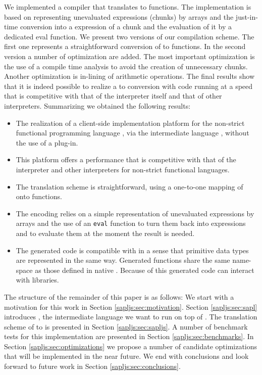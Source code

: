 We implemented a compiler that translates \Sapl to \JS functions. 
The implementation is based on representing unevaluated expressions (chunks) by \JS arrays 
and the just-in-time conversion 
into a \JS expression of a chunk and the evaluation of it by a dedicated \textsf{eval} function.
We present two versions of our compilation scheme. 
The first one represents a straightforward conversion of \Sapl to \JS functions.
In the second version a number of optimization are added.
The most important optimization is the use of a compile time analysis to avoid the creation 
of unnecessary chunks. 
Another optimization is in-lining of arithmetic operations.
The final results show that it is indeed possible to realize a \Sapl to \JS conversion with code running at a speed that is competitive with that
of the \Sapl interpreter itself and that of other interpreters.
Summarizing we obtained the following results:
\begin{itemize}
\item The realization of a client-side implementation platform for the non-strict functional programming
language \Clean, via the intermediate language \Sapl, without the use of a plug-in.
\item This platform offers a performance that is competitive with that of the \Sapl interpreter
and other interpreters for non-strict functional languages.
\item The translation scheme is straightforward, using a one-to-one mapping of \Sapl onto \JS
functions.
\item The encoding relies on a simple representation of unevaluated expressions by \JS arrays 
and the use of an \texttt{eval} function to turn them back into expressions and to evaluate them at the moment the result is needed.
\item The generated code is compatible with \JS in a sense that primitive data types 
are represented in the same way. 
Generated functions share the same name-space as those defined in native \JS.
Because of this generated code can interact with  \JS libraries.
\end{itemize}
The structure of the remainder of this paper is as follows:
We start with a motivation for this work in Section \ref{sapljs:sec:motivation}.
Section \ref{sapljs:sec:sapl} introduces \Sapl, the intermediate language we want to run on top of \JS.
The translation scheme of \Sapl to \JS is presented in Section \ref{sapljs:sec:sapljs}.
A number of benchmark tests for this implementation are presented in Section \ref{sapljs:sec:benchmarks}.
In Section \ref{sapljs:sec:optimizations} we propose a number of candidate optimizations that will be implemented in the near future.
We end with conclusions and look forward to future work in Section \ref{sapljs:sec:conclusions}.

